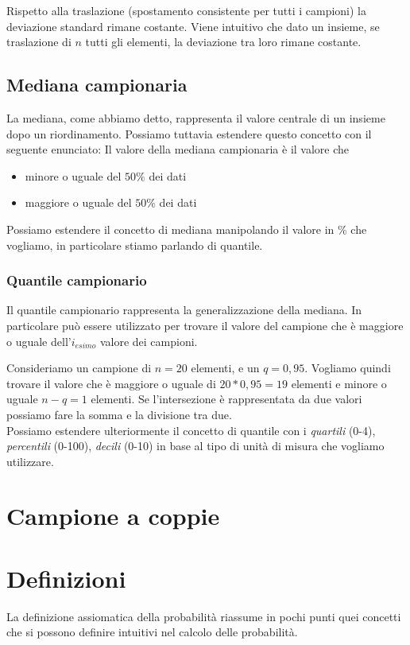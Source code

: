 Rispetto alla traslazione (spostamento consistente per tutti i campioni) la deviazione standard rimane costante. Viene intuitivo che dato un insieme, se traslazione di $n$ tutti gli elementi, la deviazione tra loro rimane costante.

\subsection{Mediana campionaria}
La mediana, come abbiamo detto, rappresenta il valore centrale di un insieme dopo un riordinamento. Possiamo tuttavia estendere questo concetto con il seguente enunciato:
Il valore della mediana campionaria è il valore che \begin{itemize}
\item minore o uguale del $50\%$ dei dati
\item maggiore o uguale del $50\%$ dei dati
\end{itemize}
Possiamo estendere il concetto di mediana manipolando il valore in \% che vogliamo, in particolare stiamo parlando di quantile. 
\subsubsection{Quantile campionario}
Il quantile campionario rappresenta la generalizzazione della mediana. In particolare può essere utilizzato per trovare il valore del campione che è maggiore o uguale dell'$i_{esimo}$ valore dei campioni. 

Consideriamo un campione di $n = 20$ elementi, e un $q = 0,95$. Vogliamo quindi trovare il valore che è maggiore o uguale di $20 * 0,95 = 19$ elementi e minore o uguale $n - q = 1$ elementi. Se l'intersezione è rappresentata da due valori possiamo fare la somma e la divisione tra due.\\

Possiamo estendere ulteriormente il concetto di quantile con i \emph{quartili} (0-4), \emph{percentili} (0-100), \emph{decili} (0-10) in base al tipo di unità di misura che vogliamo utilizzare.

\section{Campione a coppie}



\section{Definizioni}
La definizione assiomatica della probabilità riassume in pochi punti quei concetti che si possono definire intuitivi nel calcolo delle probabilità.

